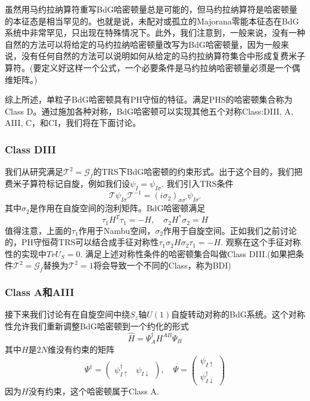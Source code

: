 \documentclass{article}
\numberwithin{equation}{subsection}
\newcommand{\mT}{\mathcal{T}}
\begin{document}
虽然用马约拉纳算符重写BdG哈密顿量总是可能的，但马约拉纳算符是哈密顿量的本征态是相当罕见的。也就是说，未配对或孤立的Majorana零能本征态在BdG系统中非常罕见，只出现在特殊情况下。此外，我们注意到，一般来说，没有一种自然的方法可以将给定的马约拉纳哈密顿量改写为BdG哈密顿量，因为一般来说，没有任何自然的方法可以说明如何从给定的马约拉纳算符集合中形成复费米子算符。(要定义好这样一个公式，一个必要条件是马约拉纳哈密顿量必须是一个偶维矩阵。)

综上所述，单粒子BdG哈密顿具有PH守恒的特征。满足PHS的哈密顿集合称为Class D。通过施加各种对称，BdG哈密顿可以实现其他五个对称Class:DIII, A, AIII, C，和CI，我们将在下面讨论。
\subsubsection{Class DIII}
我们从研究满足$\mT^2=\mathcal{G}_f$的TRS下BdG哈密顿的约束形式。出于这个目的，我们把费米子算符标记自旋，例如我们设$\psi_I=\psi_{I\sigma}$. 我们引入TRS条件
\begin{equation}
    \mT\psi_{I\sigma}\mT^{-1}=(i\sigma_2)_{\sigma\sigma'}\psi_{I\sigma'}
\end{equation}
其中$\sigma_2$是作用在自旋空间的泡利矩阵。BdG哈密顿满足
\begin{equation}
    \tau_1 H^T \tau_1=-H,\quad\sigma_2 H^*\sigma_2=H
\end{equation}
值得注意，上面的$\tau_1$作用于Nambu空间，$\sigma_2$作用于自旋空间。正如我们之前讨论的，PH守恒荷TRS可以结合成手征对称性$\tau_1\sigma_2 H\sigma_2\tau_1=-H$. 观察在这个手征对称性的实现中$TrU_S=0$. 满足上述对称性条件的哈密顿集合叫做Class DIII.(如果把条件$\mT^2=\mathcal{G}_f$替换为$\mT^2=1$将会导致一个不同的Class，称为BDI)

\subsubsection{Class A和AIII}
接下来我们讨论有在自旋空间中绕$S_z$轴$U(1)$自旋转动对称的BdG系统。这个对称性允许我们重新调整BdG哈密顿到一个约化的形式
\begin{equation}\label{class a}
    \hat{H}=\Psi_A^\dagger H^{AB}\Psi_B
\end{equation}
其中$H$是$2N$维没有约束的矩阵
\begin{equation}\label{spinor}
    \Psi^\dagger=\begin{pmatrix}
        \psi_{I\uparrow}^\dagger&\psi_{I\downarrow}
    \end{pmatrix},\quad \Psi=\begin{pmatrix}
        \psi_{I\uparrow}\\
        \psi_{I\downarrow}^\dagger
    \end{pmatrix}
\end{equation}
因为$H$没有约束，这个哈密顿属于Class A.
\end{document}
